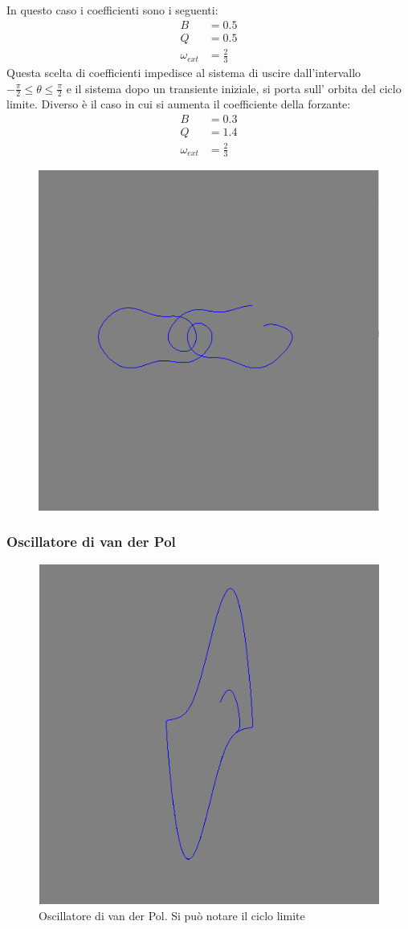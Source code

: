 In questo caso i coefficienti sono i seguenti:
\begin{align*}
B \ & = 0.5\\
Q & = 0.5 \\
\omega_{ext} &= \tfrac{2}{3}
\end{align*}
Questa scelta di coefficienti impedisce al sistema di uscire dall'intervallo $ -\tfrac{\pi}{2} \leq \theta \leq \tfrac{\pi}{2}$ e il sistema dopo un transiente iniziale,
si porta sull' orbita del ciclo limite.
Diverso è il caso in cui si aumenta il coefficiente della forzante:
\begin{align*}
B \ & = 0.3\\
Q & = 1.4 \\
\omega_{ext} &= \tfrac{2}{3}
\end{align*}
\begin{figure}[!h]
\centering
\includegraphics[width=0.7\columnwidth]{sovra1.png}
\end{figure}


\subsubsection{Oscillatore di van der Pol}
\begin{figure}[!h]
  \centering
  \includegraphics[width = 0.6\columnwidth]{van_der_pol.png}
  \caption{\small{Oscillatore di van der Pol. Si può notare il ciclo limite}}
  \label{fig:vanderpol}
  \end{figure}

